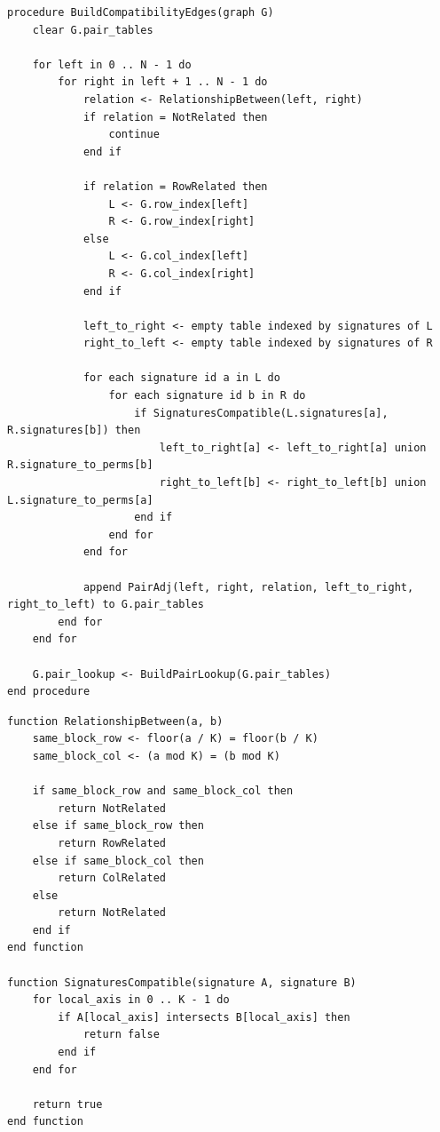 \documentclass[11pt,a4paper]{article}
\begin{document}
\begin{lstlisting}[caption={Create compatibility edges between related minigrids}]
procedure BuildCompatibilityEdges(graph G)
    clear G.pair_tables

    for left in 0 .. N - 1 do
        for right in left + 1 .. N - 1 do
            relation <- RelationshipBetween(left, right)
            if relation = NotRelated then
                continue
            end if

            if relation = RowRelated then
                L <- G.row_index[left]
                R <- G.row_index[right]
            else
                L <- G.col_index[left]
                R <- G.col_index[right]
            end if

            left_to_right <- empty table indexed by signatures of L
            right_to_left <- empty table indexed by signatures of R

            for each signature id a in L do
                for each signature id b in R do
                    if SignaturesCompatible(L.signatures[a], R.signatures[b]) then
                        left_to_right[a] <- left_to_right[a] union R.signature_to_perms[b]
                        right_to_left[b] <- right_to_left[b] union L.signature_to_perms[a]
                    end if
                end for
            end for

            append PairAdj(left, right, relation, left_to_right, right_to_left) to G.pair_tables
        end for
    end for

    G.pair_lookup <- BuildPairLookup(G.pair_tables)
end procedure
\end{lstlisting}

\begin{lstlisting}[caption={Relationship and signature compatibility}]
function RelationshipBetween(a, b)
    same_block_row <- floor(a / K) = floor(b / K)
    same_block_col <- (a mod K) = (b mod K)

    if same_block_row and same_block_col then
        return NotRelated
    else if same_block_row then
        return RowRelated
    else if same_block_col then
        return ColRelated
    else
        return NotRelated
    end if
end function

function SignaturesCompatible(signature A, signature B)
    for local_axis in 0 .. K - 1 do
        if A[local_axis] intersects B[local_axis] then
            return false
        end if
    end for

    return true
end function
\end{lstlisting}
\end{document}
